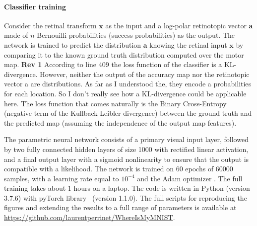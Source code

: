 
\paragraph{Classifier training}

Consider the retinal transform $\boldsymbol{x}$ as the input and a log-polar retinotopic vector $\boldsymbol{a}$ made of $n$ Bernouilli probabilities (success probabilities) as the output. %
The network is trained to predict the distribution $\boldsymbol{a}$ knowing the retinal input $\boldsymbol{x}$ by comparing it to the known ground truth distribution computed over the motor map. 
{\color{magenta} \textbf{Rev 1} According to line 409 the loss function of the classifier is a KL-divergence. However, neither the output of the accuracy map nor the retinotopic vector a are distributions. As far as I understood the, they encode a probabilities for each location. So I don't really see how a KL-divergence could be applicable here.}
The loss function that comes naturally is the Binary Cross-Entropy (negative term of the Kullback-Leibler divergence) between the ground truth and the predicted map (assuming the independence of the output map features).


The parametric neural network consists of a primary visual input layer, followed by two fully connected hidden layers of size 1000  with rectified linear activation,
and a final output layer with a sigmoid nonlinearity to ensure that the output is compatible with a likelihood.
The network is trained on 60 epochs of 60000 samples, with a learning rate equal to $10^{-4}$ and the Adam optimizer \cite{kingma2014adam}.
The full training takes about $1$ hours on a laptop. The code is written in Python (version 3.7.6) with pyTorch library~\cite{Paszke17} (version 1.1.0). The full scripts for reproducing the figures and extending the results to a full range of parameters is available at \url{https://github.com/laurentperrinet/WhereIsMyMNIST}. %
